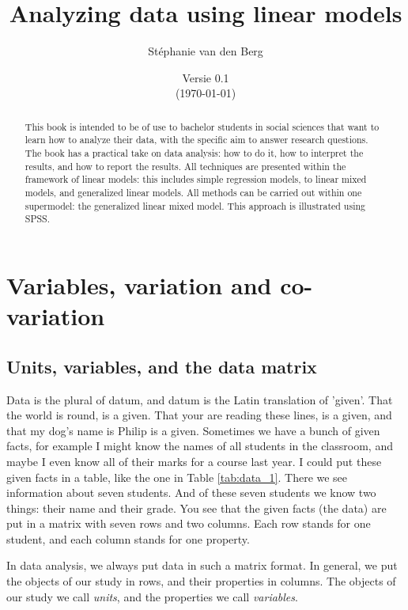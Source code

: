 \documentclass[]{report}\usepackage[]{graphicx}\usepackage[]{color}
\title{Analyzing data using linear models}
\author{St\'ephanie van den Berg}
\date{Versie 0.1 \\ (\today)}
\begin{document}
\maketitle




\begin{abstract}
This book is intended to be of use to bachelor students in social sciences that want to learn how to analyze their data, with the specific aim to answer research questions. The book has a practical take on data analysis: how to do it, how to interpret the results, and how to report the results. All techniques are presented within the framework of linear models: this includes simple regression models, to linear mixed models, and generalized linear models. All methods can be carried out within one supermodel: the generalized linear mixed model. This approach is illustrated using SPSS.
\end{abstract}


\tableofcontents



\chapter{Variables, variation and co-variation} \label{chap:intro}



\section{Units, variables, and the data matrix}





Data is the plural of datum, and datum is the Latin translation of 'given'. That the world is round, is a given. That your are reading these lines, is a given, and that my dog's name is Philip is a given. Sometimes we have a bunch of given facts, for example I might know the names of all students in the classroom, and maybe I even know all of their marks for a course last year. I could put these given facts in a table, like the one in Table \ref{tab:data_1}. There we see information about seven students. And of these seven students we know two things: their name and their grade. You see that the given facts (the data) are put in a matrix with seven rows and two columns. Each row stands for one student, and each column stands for one property.

In data analysis, we always put data in such a matrix format. In general, we put the objects of our study in rows, and their properties in columns. The objects of our study we call \textit{units}, and the properties we call \textit{variables}.
\end{document}
